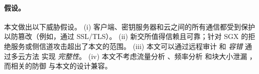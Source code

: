 \paragraph*{假设。}
本文做出以下威胁假设。 (i) 客户端、密钥服务器和云之间的所有通信都受到保护以防篡改（例如，通过 SSL/TLS）。 (ii) 新交所值得信赖且可靠；针对 SGX \cite{bulck2018FORESHADOW, oleksenko18} 的拒绝服务或侧信道攻击超出了本文的范围。 (iii) 本文可以通过远程审计 \cite{ateniese2007provable, juels2007pors} 和 \textit{ 容错} 通过多云方法 \cite{li15} 实现 \textit{ 完整性}。 (iv) 本文不考虑流量分析 \cite{zuo2018mitigating}、频率分析 \cite{li2020TED} 和块大小泄漏 \cite{ritzdorf16}，而相关的防御 \cite{zuo2018mitigating,li2020TED,ritzdorf16} 与本文的设计兼容。
